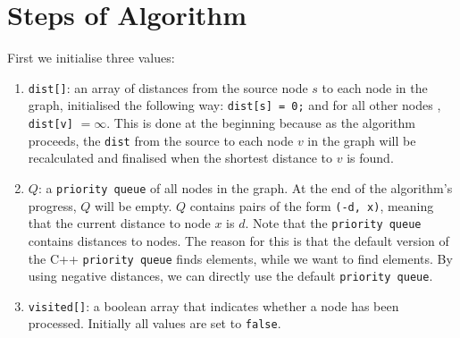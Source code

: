 \documentclass[twoside,12pt,a4paper,english]{book}
\theoremstyle{definition}
\theoremstyle{problemstyle}
\theoremstyle{problemstyle}
\theoremstyle{problemstyle}
\begin{document}
\section{Steps of Algorithm}
First we initialise three values:
\begin{enumerate}
    \item \texttt{dist[]}: an array of distances from the source node $s$ to each node in the graph, initialised the following way: \texttt{dist[s] = 0;} and for all other nodes , \texttt{dist[v]} $= \infty$. This is done at the beginning because as the algorithm proceeds, the \texttt{dist} from the source to each node $v$ in the graph will be recalculated and finalised when the shortest distance to $v$ is found.
    
    \item $Q$: a \texttt{priority queue} of all nodes in the graph. At the end of the algorithm's progress, $Q$ will be empty. $Q$ contains pairs of the form \texttt{(-d, x)}, meaning that the current distance to node $x$ is $d$. Note that the \texttt{priority queue} contains  distances to nodes. The reason for this is that the default version of the C++ \texttt{priority queue} finds  elements, while we want to find  elements. By using negative distances, we can directly use the default \texttt{priority queue}. 
    
    \item \texttt{visited[]}: a boolean array that indicates whether a node has
    been processed. Initially all values are set to \texttt{false}.
\end{enumerate}
\end{document}
